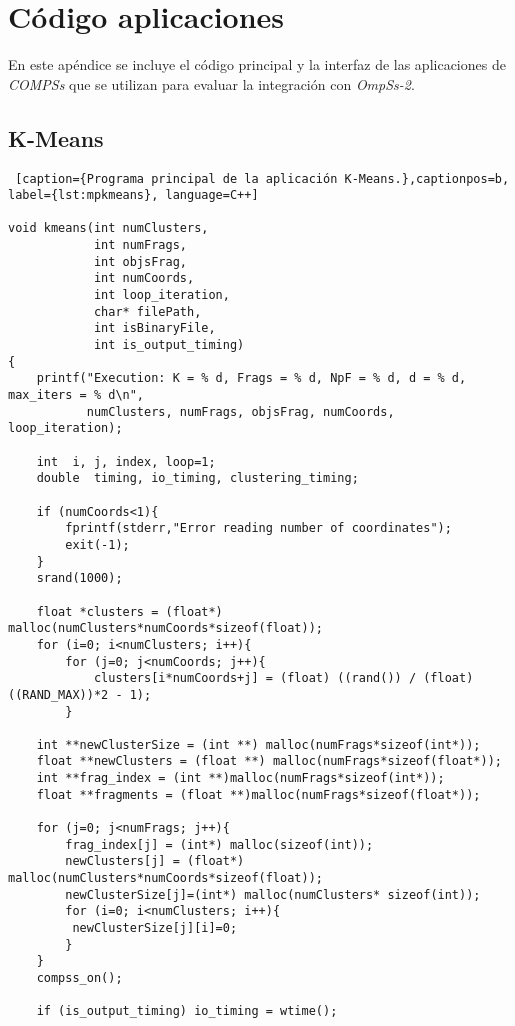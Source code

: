 \section{Código aplicaciones}
En este apéndice se incluye el código principal y la interfaz de las aplicaciones de \textit{COMPSs} que se utilizan para evaluar la integración con \textit{OmpSs-2}.

\subsection{K-Means}
\label{sec:codigokmeans}

\begin{lstlisting} [caption={Programa principal de la aplicación K-Means.},captionpos=b, 
label={lst:mpkmeans}, language=C++]

void kmeans(int numClusters, 
			int numFrags, 
			int objsFrag, 
			int numCoords, 
			int loop_iteration, 
			char* filePath, 
			int isBinaryFile, 
			int is_output_timing)
{
    printf("Execution: K = % d, Frags = % d, NpF = % d, d = % d, max_iters = % d\n", 
		   numClusters, numFrags, objsFrag, numCoords, loop_iteration);
 
    int  i, j, index, loop=1;
    double  timing, io_timing, clustering_timing;

    if (numCoords<1){
        fprintf(stderr,"Error reading number of coordinates");
        exit(-1);
    }
    srand(1000);

    float *clusters = (float*) malloc(numClusters*numCoords*sizeof(float));
    for (i=0; i<numClusters; i++){
        for (j=0; j<numCoords; j++){
            clusters[i*numCoords+j] = (float) ((rand()) / (float)((RAND_MAX))*2 - 1);
        }
    
    int **newClusterSize = (int **) malloc(numFrags*sizeof(int*));
    float **newClusters = (float **) malloc(numFrags*sizeof(float*));
    int **frag_index = (int **)malloc(numFrags*sizeof(int*));
    float **fragments = (float **)malloc(numFrags*sizeof(float*));

    for (j=0; j<numFrags; j++){
        frag_index[j] = (int*) malloc(sizeof(int));
        newClusters[j] = (float*) malloc(numClusters*numCoords*sizeof(float));
    	newClusterSize[j]=(int*) malloc(numClusters* sizeof(int));
        for (i=0; i<numClusters; i++){
		 newClusterSize[j][i]=0;
        }
    }
    compss_on();

    if (is_output_timing) io_timing = wtime();


\end{lstlisting}
